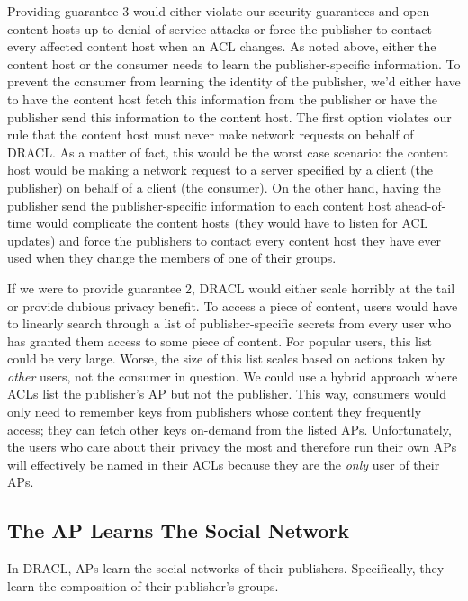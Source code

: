 \documentclass[pdftex,12pt,a4papaer]{report}
\begin{document}
Providing guarantee 3 would either violate our security guarantees and open
content hosts up to denial of service attacks or force the publisher to
contact every affected content host when an ACL changes. As noted above, either
the content host or the consumer needs to learn the publisher-specific information.
To prevent the consumer from learning the identity of the publisher, we'd either
have to have the content host fetch this information from the publisher or have the
publisher send this information to the content host. The first option violates our
rule that the content host must never make network requests on behalf of DRACL\@.
As a matter of fact, this would be the worst case scenario: the content host
would be making a network request to a server specified by a client (the publisher) on behalf of a client (the consumer). On the other hand, having the publisher
send the publisher-specific information to each content host ahead-of-time would
complicate the content hosts (they would have to listen for ACL updates) and
force the publishers to contact every content host they have ever used when
they change the members of one of their groups.

If we were to provide guarantee 2, DRACL would either scale horribly at the tail
or provide dubious privacy benefit. To access a piece of content, users would
have to linearly search through a list of publisher-specific secrets from every user
who has granted them access to some piece of content. For popular users, this
list could be very large. Worse, the size of this list scales based on actions
taken by \emph{other} users, not the consumer in question. We could use a hybrid
approach where ACLs list the publisher's AP but not the publisher. This
way, consumers would only need to remember keys from publishers whose
content they frequently access; they can fetch other keys on-demand from the
listed APs. Unfortunately, the users who care about their privacy the most and
therefore run their own APs will effectively be named in their ACLs because they
are the \emph{only} user of their APs.

\subsection{The AP Learns The Social Network}

In DRACL, APs learn the social networks of their publishers. Specifically,
they learn the composition of their publisher's groups.
\end{document}
